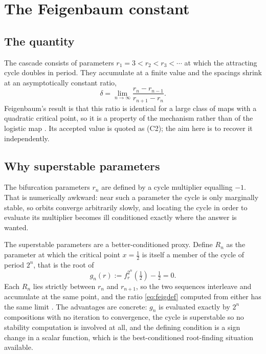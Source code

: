 \documentclass[11pt,a4paper]{article}
\theoremstyle{definition}
\theoremstyle{remark}
\newcommand{\logmap}{f_r}
\begin{document}
\section{The Feigenbaum constant}
\label{sec:feigenbaum}

\subsection{The quantity}

The cascade consists of parameters $r_1=3<r_2<r_3<\cdots$ at which the
attracting cycle doubles in period. They accumulate at a finite value and the
spacings shrink at an asymptotically constant ratio,
\begin{equation}
  \delta = \lim_{n\to\infty}\frac{r_n-r_{n-1}}{r_{n+1}-r_n} .
  \label{eq:feigdef}
\end{equation}
Feigenbaum's result is that this ratio is identical for a large class of maps
with a quadratic critical point, so it is a property of the mechanism rather
than of the logistic map \cite{Feigenbaum1978}. Its accepted value is quoted
as (C2); the aim here is to recover it independently.

\subsection{Why superstable parameters}

The bifurcation parameters $r_n$ are defined by a cycle multiplier equalling
$-1$. That is numerically awkward: near such a parameter the cycle is only
marginally stable, so orbits converge arbitrarily slowly, and locating the
cycle in order to evaluate its multiplier becomes ill conditioned exactly
where the answer is wanted.

The superstable parameters are a better-conditioned proxy. Define $R_n$ as the
parameter at which the critical point $x=\tfrac12$ is itself a member of the
cycle of period $2^{n}$, that is the root of
\begin{equation}
  g_n(r) := \logmap^{2^{n}}\!\left(\tfrac12\right) - \tfrac12 = 0 .
  \label{eq:superstabledef}
\end{equation}
Each $R_n$ lies strictly between $r_n$ and $r_{n+1}$, so the two sequences
interleave and accumulate at the same point, and the ratio \eqref{eq:feigdef}
computed from either has the same limit \cite{Feigenbaum1978}. The advantages are concrete: $g_n$ is
evaluated exactly by $2^{n}$ compositions with no iteration to convergence,
the cycle is superstable so no stability computation is involved at all, and
the defining condition is a sign change in a scalar function, which is the
best-conditioned root-finding situation available.
\end{document}
